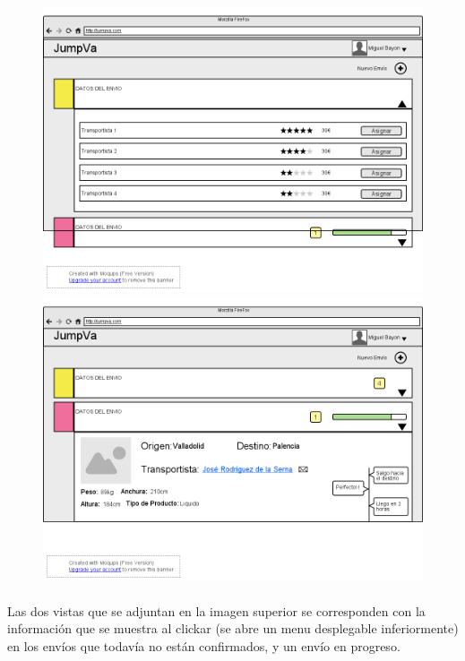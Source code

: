 \documentclass[10pt, a4paper,spanish]{article}
\begin{document}
			\begin{figure}[H]
				\centering
				\begin{minipage}[b]{0.49\textwidth}
					\includegraphics[width=\textwidth]{res/ExpansionEnvioPendienteAsignacion.png}

				\end{minipage}
				\begin{minipage}[b]{0.49\textwidth}
					\includegraphics[width=\textwidth]{res/ExpansionEnvioEnProceso.png}
				\end{minipage}
			\end{figure}

			\paragraph{}
			Las dos vistas que se adjuntan en la imagen superior se corresponden con la información que se muestra al clickar (se abre un menu desplegable inferiormente) en los envíos que todavía no están confirmados, y un envío en progreso.
\end{document}
